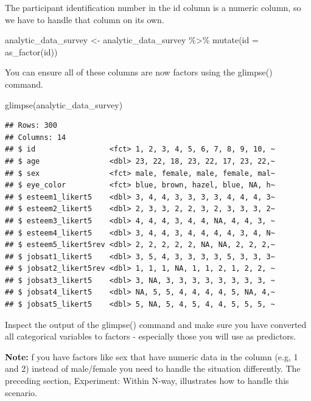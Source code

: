 \documentclass[
]{krantz}
\makeatletter
\newenvironment{Shaded}{\begin{snugshade}}{\end{snugshade}}
\newcommand{\AttributeTok}[1]{\textcolor[rgb]{0.61,0.61,0.61}{#1}}
\newcommand{\FunctionTok}[1]{\textcolor[rgb]{0,0,0}{#1}}
\newcommand{\NormalTok}[1]{#1}
\newcommand{\OtherTok}[1]{\textcolor[rgb]{0.37,0.37,0.37}{#1}}
\newcommand{\SpecialCharTok}[1]{\textcolor[rgb]{0,0,0}{#1}}
\newenvironment{kframe}{%
\medskip{}
\setlength{\fboxsep}{.8em}
 \def\at@end@of@kframe{}%
 \ifinner\ifhmode%
  \def\at@end@of@kframe{\end{minipage}}%
  \begin{minipage}{\columnwidth}%
 \fi\fi%
 \def\FrameCommand##1{\hskip\@totalleftmargin \hskip-\fboxsep
 \colorbox{shadecolor}{##1}\hskip-\fboxsep
     \hskip-\linewidth \hskip-\@totalleftmargin \hskip\columnwidth}%
 \MakeFramed {\advance\hsize-\width
   \@totalleftmargin\z@ \linewidth\hsize
   \@setminipage}}%
 {\par\unskip\endMakeFramed%
 \at@end@of@kframe}
\renewenvironment{Shaded}{\begin{kframe}}{\end{kframe}}
\makeatother
\begin{document}
The participant identification number in the id column is a numeric column, so we have to handle that column on its own.

\begin{Shaded}
\begin{Highlighting}[]
\NormalTok{analytic\_data\_survey }\OtherTok{\textless{}{-}}\NormalTok{ analytic\_data\_survey }\SpecialCharTok{\%\textgreater{}\%}
  \FunctionTok{mutate}\NormalTok{(}\AttributeTok{id =} \FunctionTok{as\_factor}\NormalTok{(id))}
\end{Highlighting}
\end{Shaded}

You can ensure all of these columns are now factors using the glimpse() command.

\begin{Shaded}
\begin{Highlighting}[]
\FunctionTok{glimpse}\NormalTok{(analytic\_data\_survey)}
\end{Highlighting}
\end{Shaded}

\begin{verbatim}
## Rows: 300
## Columns: 14
## $ id                 <fct> 1, 2, 3, 4, 5, 6, 7, 8, 9, 10, ~
## $ age                <dbl> 23, 22, 18, 23, 22, 17, 23, 22,~
## $ sex                <fct> male, female, male, female, mal~
## $ eye_color          <fct> blue, brown, hazel, blue, NA, h~
## $ esteem1_likert5    <dbl> 3, 4, 4, 3, 3, 3, 3, 4, 4, 4, 3~
## $ esteem2_likert5    <dbl> 2, 3, 3, 2, 2, 3, 2, 3, 3, 3, 2~
## $ esteem3_likert5    <dbl> 4, 4, 4, 3, 4, 4, NA, 4, 4, 3, ~
## $ esteem4_likert5    <dbl> 3, 4, 4, 3, 4, 4, 4, 4, 3, 4, N~
## $ esteem5_likert5rev <dbl> 2, 2, 2, 2, 2, NA, NA, 2, 2, 2,~
## $ jobsat1_likert5    <dbl> 3, 5, 4, 3, 3, 3, 3, 5, 3, 3, 3~
## $ jobsat2_likert5rev <dbl> 1, 1, 1, NA, 1, 1, 2, 1, 2, 2, ~
## $ jobsat3_likert5    <dbl> 3, NA, 3, 3, 3, 3, 3, 3, 3, 3, ~
## $ jobsat4_likert5    <dbl> NA, 5, 5, 4, 4, 4, 4, 5, NA, 4,~
## $ jobsat5_likert5    <dbl> 5, NA, 5, 4, 5, 4, 4, 5, 5, 5, ~
\end{verbatim}

Inspect the output of the glimpse() command and make sure you have converted all categorical variables to factors - especially those you will use as predictors.

\textbf{Note:} f you have factors like sex that have numeric data in the column (e.g, 1 and 2) instead of male/female you need to handle the situation differently. The preceding section, Experiment: Within N-way, illustrates how to handle this scenario.
\end{document}
